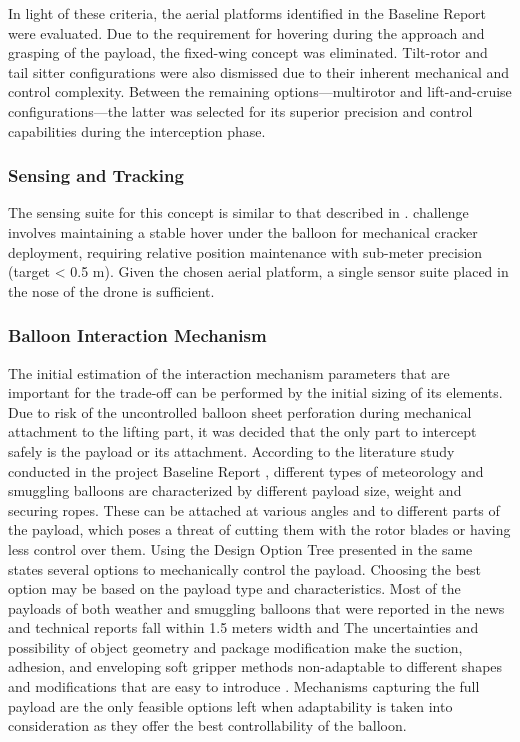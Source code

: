 In light of these criteria, the aerial platforms identified in the Baseline Report \cite{Group222026DSEReport} were evaluated. Due to the requirement for hovering during the approach and grasping of the payload, the fixed-wing concept was eliminated. Tilt-rotor and tail sitter configurations were also dismissed due to their inherent mechanical and control complexity. Between the remaining options—multirotor and lift-and-cruise configurations—the latter was selected for its superior precision and control capabilities during the interception phase.
\subsubsection{Sensing and Tracking}
The sensing suite for this concept is similar to that described in .
challenge involves maintaining a stable hover under the balloon for mechanical cracker deployment, requiring relative position maintenance with sub-meter precision (target < 0.5 m). Given the chosen aerial
platform, a single sensor suite placed in the nose of the drone is sufficient.


\subsubsection{Balloon Interaction Mechanism}
The initial estimation of the interaction mechanism parameters that are important for the trade-off can be performed by the initial sizing of its elements. Due to risk of the uncontrolled balloon sheet perforation during mechanical attachment to the lifting part, it was decided that the only part to intercept safely is the payload or its attachment. According to the literature study conducted in the project Baseline Report \cite{Group222026DSEReport}, different types of meteorology and smuggling balloons are characterized by different payload size, weight and securing ropes. These can be attached at various angles and to different parts of the payload, which poses a threat of cutting them with the rotor blades or having less control over them. Using the Design Option Tree presented in the same states several options to mechanically control the payload. Choosing the best option may be based on the payload type and characteristics. Most of the payloads of both weather and smuggling balloons that were reported in the news and technical reports fall within 1.5 meters width and 
The uncertainties and possibility of object geometry and package modification make the suction, adhesion, and enveloping soft gripper  methods non-adaptable to different shapes and modifications that are easy to introduce \cite{Group222026DSEReport}. Mechanisms capturing the full payload are the only feasible options left when adaptability is taken into consideration as they offer the best controllability of the balloon. 





